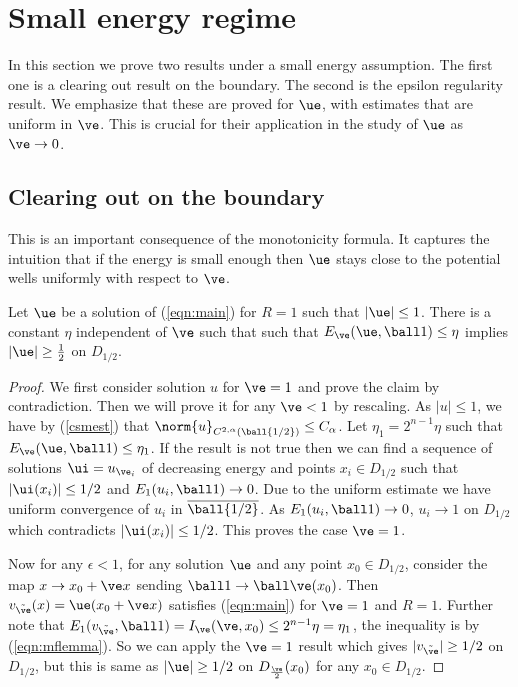 \section{Small energy regime}
In this section we prove two results under a small energy assumption. The first one is a clearing out result on the boundary. The second is the epsilon regularity result. We emphasize that these are proved for $\ue$, with estimates that are uniform in $\ve$. This is crucial for their application in the study of $\ue$ as $\ve \to 0$.

\subsection{Clearing out on the boundary} This is an important consequence of the monotonicity formula. It captures the intuition that if the energy is small enough then $\ue$ stays close to the potential wells uniformly with respect to $\ve$.
\begin{lemm} \label{lemmaclearing}
Let $\ue$ be a solution of (\ref{eqn:main}) for $R=1$ such that $|\ue| \leq 1$. There is a constant $\eta$ independent of $\ve$ such that such that $E_\ve(\ue,\ball 1)\leq \eta$ implies $|\ue| \geq \frac{1}{2}$ on $D_{1/2}$.
\end{lemm}
\begin{proof}


We first consider solution $u$ for $\ve =1$ and prove the claim by contradiction. Then we will prove it for any $\ve<1$ by rescaling. As $|u| \leq 1$, we have by (\ref{csmest}) that $\norm{u}_{C^{2,\alpha}(\ball {1/2})} \leq C_{\alpha}$. Let $\eta_1=2^{n-1}\eta$ such that $E_\ve(\ue,\ball 1)\leq \eta_1$. If the result is not true then we can find a sequence of solutions $\ui = u_{\ve_i}$ of decreasing energy and points $x_i \in D_{1/2}$ such that $|\ui(x_i)|\leq 1/2$ and $E_1(u_i,\ball 1) \to 0$. Due to the uniform estimate we have uniform convergence of $u_i$ in $\overline{\ball {1/2}}$. As $E_1(u_i,\ball 1) \to 0$, $u_i \to 1$ on $D_{1/2}$ which contradicts $|\ui(x_i)|\leq 1/2$. This proves the case $\ve=1$. 

Now for any $\epsilon<1$, for any solution $\ue$ and any point $x_0 \in D_{1/2}$,  consider the map $x \to x_0 + \ve x$ sending $\ball 1 \to \ball \ve (x_0)$. Then $v_{\Tilde{\ve}}(x)=\ue(x_0+\ve x)$ satisfies (\ref{eqn:main}) for $\ve=1$ and $R=1$. Further note that $E_1(v_{\Tilde{\ve}}, \ball 1)= I_{\ve}(\ve,x_0) \leq 2^{n-1} \eta=\eta_1$, the inequality is by (\ref{eqn:mflemma}). So we can apply the $\ve=1$ result which gives $|v_{\Tilde{\ve}}| \geq 1/2$ on $D_{1/2}$, but this is same as $|\ue| \geq 1/2$ on $D_{\frac{\ve}{2}}(x_0)$ for any $x_0 \in D_{1/2}$.
\end{proof}


